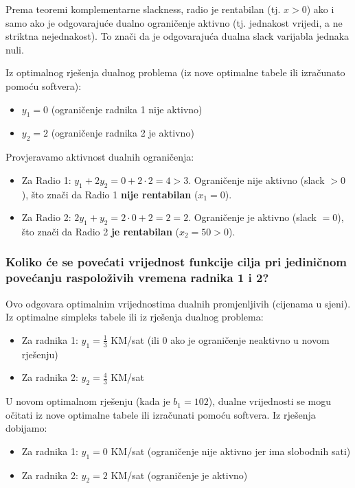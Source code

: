 \documentclass[12pt,a4paper]{article}
\begin{document}
Prema teoremi komplementarne slackness, radio je rentabilan (tj. $x > 0$) ako i samo ako je odgovarajuće dualno ograničenje aktivno (tj. jednakost vrijedi, a ne striktna nejednakost). To znači da je odgovarajuća dualna slack varijabla jednaka nuli.

Iz optimalnog rješenja dualnog problema (iz nove optimalne tabele ili izračunato pomoću softvera):
\begin{itemize}
\item $y_1 = 0$ (ograničenje radnika 1 nije aktivno)
\item $y_2 = 2$ (ograničenje radnika 2 je aktivno)
\end{itemize}

Provjeravamo aktivnost dualnih ograničenja:
\begin{itemize}
\item Za Radio 1: $y_1 + 2y_2 = 0 + 2 \cdot 2 = 4 > 3$. Ograničenje nije aktivno (slack $> 0$), što znači da Radio 1 \textbf{nije rentabilan} ($x_1 = 0$).
\item Za Radio 2: $2y_1 + y_2 = 2 \cdot 0 + 2 = 2 = 2$. Ograničenje je aktivno (slack $= 0$), što znači da Radio 2 \textbf{je rentabilan} ($x_2 = 50 > 0$).
\end{itemize}

\subsubsection{Koliko će se povećati vrijednost funkcije cilja pri jediničnom povećanju raspoloživih vremena radnika 1 i 2?}

Ovo odgovara optimalnim vrijednostima dualnih promjenljivih (cijenama u sjeni). Iz optimalne simpleks tabele ili iz rješenja dualnog problema:

\begin{itemize}
\item Za radnika 1: $y_1 = \frac{1}{3}$ KM/sat (ili 0 ako je ograničenje neaktivno u novom rješenju)
\item Za radnika 2: $y_2 = \frac{4}{3}$ KM/sat
\end{itemize}

U novom optimalnom rješenju (kada je $b_1 = 102$), dualne vrijednosti se mogu očitati iz nove optimalne tabele ili izračunati pomoću softvera. Iz rješenja dobijamo:
\begin{itemize}
\item Za radnika 1: $y_1 = 0$ KM/sat (ograničenje nije aktivno jer ima slobodnih sati)
\item Za radnika 2: $y_2 = 2$ KM/sat (ograničenje je aktivno)
\end{itemize}
\end{document}
